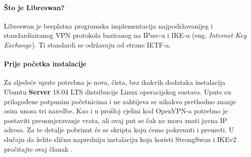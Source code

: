 \bigbreak
\paragraph*{Što je Libreswan?}
\hfill \smallbreak
Libreswan\cite{libreswan} je besplatna programska implementacija najpodržavanijeg i standardiziranog VPN protokola baziranog na IPsec-u i IKE-u (eng. \textit{Internet Key Exchange}). Ti standardi se održavaju od strane IETF-a.
\bigbreak
\paragraph*{Prije početka instalacije}
\hfill \smallbreak
Za sljedeće upute potrebna je nova, čista, bez ikakvih dodataka instalacija  Ubuntu \textbf{Server} 18.04 LTS distribucije Linux operacijskog sustava. Upute su prilagođene potpunim početnicima i ne zahtijeva se nikakvo prethodno znanje osim unosa tri naredbe. Kao i u prošloj cjelini kod OpenVPN-a potrebno je postaviti preusmjeravanje vrata, ali ovaj put se čak ne mora znati javna IP adresa. Za te detalje pobrinut će se skripta\cite{skripta-libreswan} koju ćemo pokrenuti i preuzeti. U slučaju da želite sličnu napredniju instalaciju koja koristi StrongSwan i IKEv2 pročitajte ovaj članak \cite{tutorial-librevpn}.
\bigbreak
